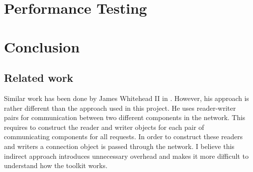 \documentclass[12pt,a4paper]{article}
\begin{document}
\section{Performance Testing}
\label{sec:test}
\newpage
\section{Conclusion}
\label{sec:conclusion}

\subsection{Related work}
Similar work has been done by James Whitehead II in \cite{whitehead}.
However, his approach is rather different than the approach used 
in this project. He uses reader-writer pairs for communication between
two different components in the network. This requires to construct the
reader and writer objects for each pair of communicating components
for all requests.
In order to construct these readers and writers a connection object is 
passed through the network.
I believe this indirect approach introduces unnecessary overhead and 
makes it more difficult to understand how the toolkit works.

\newpage
\printbibliography[
    heading=bibintoc,
    title={References}
]
\end{document}
